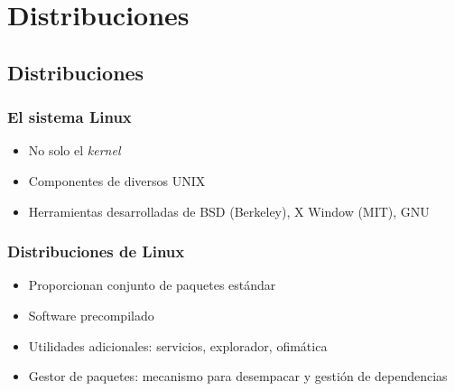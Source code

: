 \documentclass[spanish]{beamer}
\begin{document}

  \section{Distribuciones}
	\subsection{Distribuciones}
  \frame
  {
    \frametitle{El sistema Linux}
    \begin{itemize}
    	\item No solo el \textit{kernel}
    	\item Componentes de diversos UNIX
    	\item Herramientas desarrolladas de BSD (Berkeley), X Window (MIT), GNU
    \end{itemize} 
  }

  \frame
  {
    \frametitle{Distribuciones de Linux}
    \begin{itemize}
    	\item Proporcionan conjunto de paquetes est\'{a}ndar
    	\item Software precompilado
    	\item Utilidades adicionales: servicios, explorador, ofim\'{a}tica
    	\item Gestor de paquetes: mecanismo para desempacar y gesti\'{o}n de dependencias
    \end{itemize}
  }
  
\end{document}
